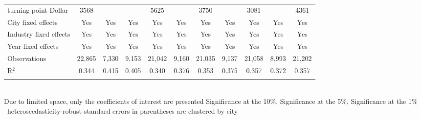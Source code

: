 \documentclass[12pt]{article}
\begin{document}
\begin{table}[!htbp]
\begin{adjustbox}{width=\textwidth, totalheight=\baselineskip,keepaspectratio}
\begin{tabular}{@{\extracolsep{5pt}}lcccccccccc}
turning point Dollar & 3568 & - & - & 5625 & - & 3750 & - & 3081 & - & 4361 \\ 
City fixed effects & Yes & Yes & Yes & Yes & Yes & Yes & Yes & Yes & Yes & Yes \\ 
Industry fixed effects & Yes & Yes & Yes & Yes & Yes & Yes & Yes & Yes & Yes & Yes \\ 
Year fixed effects & Yes & Yes & Yes & Yes & Yes & Yes & Yes & Yes & Yes & Yes \\ 
Observations & 22,865 & 7,330 & 9,153 & 21,042 & 9,160 & 21,035 & 9,137 & 21,058 & 8,993 & 21,202 \\ 
R$^{2}$ & 0.344 & 0.415 & 0.405 & 0.340 & 0.376 & 0.353 & 0.375 & 0.357 & 0.372 & 0.357 \\ 
\hline 
\hline \\[-1.8ex] 
\end{tabular}
\end{adjustbox}
\begin{tablenotes} 
 \small 
 \item \\ 
\footnotesize{
Due to limited space, only the coefficients of interest are presented 
\sym{*} Significance at the 10\%, \sym{**} Significance at the 5\%, \sym{***} Significance at the 1\% \
heteroscedasticity-robust standard errors in parentheses are clustered by city 
}
 
\end{tablenotes}
\end{table}
\end{document}
